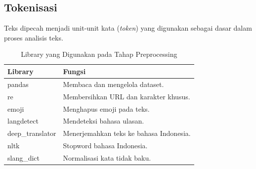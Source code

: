 \subsection{Tokenisasi}
Teks dipecah menjadi unit-unit kata (\textit{token}) yang digunakan sebagai dasar dalam proses analisis teks.

\begin{table}[H]
\centering
\caption{Library yang Digunakan pada Tahap Preprocessing}
\label{tab:library_preprocessing}
\begin{tabular}{|l|p{8cm}|}
\hline
\textbf{Library} & \textbf{Fungsi} \\
\hline
pandas & Membaca dan mengelola dataset. \\
\hline
re & Membersihkan URL dan karakter khusus. \\
\hline
emoji & Menghapus emoji pada teks. \\
\hline
langdetect & Mendeteksi bahasa ulasan. \\
\hline
deep\_translator & Menerjemahkan teks ke bahasa Indonesia. \\
\hline
nltk & Stopword bahasa Indonesia. \\
\hline
slang\_dict & Normalisasi kata tidak baku. \\
\hline
\end{tabular}
\end{table}